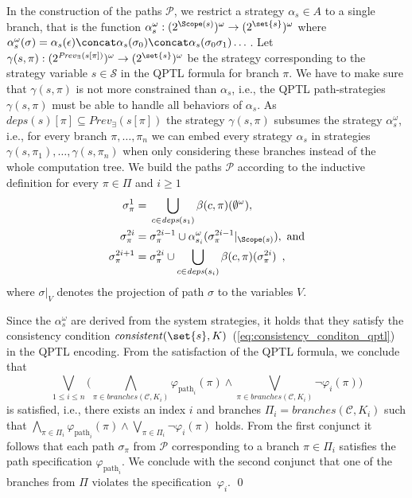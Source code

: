 \documentclass{LMCS}
\newcommand{\deps}{\mathit{deps}}
\newcommand{\branches}{\mathit{branches}}
\newcommand{\consistent}{\mathit{consistent}}
\newcommand{\Prev}{\mathit{Prev}}
\theoremstyle{plain}\newtheorem{theorem}[thm]{Theorem}
\theoremstyle{plain}\newtheorem{lemma}[thm]{Lemma}
\theoremstyle{plain}\newtheorem{proposition}[thm]{Proposition}
\theoremstyle{plain}\newtheorem{corollary}[thm]{Corollary}
\theoremstyle{definition}\newtheorem{definition}{Definition}[section]
\begin{document}
  In the construction of the paths $\mathcal{P}$, we restrict a strategy $\alpha_s \in A$ to a single branch, that is the function $\alpha_s^\omega : (2^{\Scope(s)})^\omega \rightarrow (2^\set{s})^\omega$ where $\alpha_s^\omega(\sigma) = \alpha_s(\epsilon) \concat \alpha_s(\sigma_0) \concat \alpha_s(\sigma_0 \sigma_1) \dots$.
  Let $\gamma(s,\pi) : (2^{\Prev_\exists(s[\pi])})^\omega \rightarrow (2^\set{s})^\omega$ be the strategy corresponding to the strategy variable $s \in \mathcal{S}$ in the QPTL formula for branch $\pi$.
  We have to make sure that $\gamma(s,\pi)$ is not more constrained than $\alpha_s$, i.e., the QPTL path-strategies $\gamma(s,\pi)$ must be able to handle all behaviors of $\alpha_s$.
  As $\deps(s)[\pi] \subseteq \Prev_\exists(s[\pi])$ the strategy $\gamma(s,\pi)$ subsumes the strategy $\alpha_s^\omega$, i.e., for every branch $\pi,\dots,\pi_n$ we can embed every strategy $\alpha_s$ in strategies $\gamma(s,\pi_1),\dots,\gamma(s,\pi_n)$ when only considering these branches instead of the whole computation tree.
  We build the paths $\mathcal{P}$ according to the inductive definition for every $\pi \in \Pi$ and $i \geq 1$
  \begin{align*}
    \sigma_\pi^1 = {}& \bigcup_{c \in \deps(s_1)} \beta(c,\pi)(\emptyset^\omega) , \\
    \sigma_\pi^{2i} = {}& \sigma_\pi^{2i-1} \cup \alpha_{s_i}^\omega(\sigma_\pi^{2i-1} |_{\Scope(s)}) , \text{ and}\\
    \sigma_\pi^{2i+1} = {}& \sigma_\pi^{2i} \cup \bigcup_{c \in \deps(s_i)} \beta(c,\pi)(\sigma_\pi^{2i}) \enspace,
  \end{align*}
  where $\sigma|_V$ denotes the projection of path $\sigma$ to the variables $V$.
  
  Since the $\alpha_s^\omega$ are derived from the system strategies, it holds that they satisfy the consistency condition $\consistent(\set{s},K)$~(\ref{eq:consistency_conditon_qptl}) in the QPTL encoding.
  From the satisfaction of the QPTL formula, we conclude that
  \begin{equation*}
    \bigvee_{1 \leq i \leq n} \big( \bigwedge_{\pi \in \branches(\mathcal{C},K_i)} \varphi_{\text{path}_i}(\pi) \land \bigvee_{\pi \in \branches(\mathcal{C},K_i)} \neg\varphi_i(\pi) \big)
  \end{equation*}
   is satisfied, i.e., there exists an index $i$ and branches $\Pi_i = \branches(\mathcal{C},K_i)$ such that $\bigwedge_{\pi \in \Pi_i} \varphi_{\text{path}_i}(\pi) \land \bigvee_{\pi \in \Pi_i} \neg\varphi_i(\pi)$ holds.
  From the first conjunct it follows that each path $\sigma_\pi$ from $\mathcal{P}$ corresponding to a branch $\pi \in \Pi_i$ satisfies the path specification $\varphi_{\text{path}_i}$.
  We conclude with the second conjunct that one of the branches from $\Pi$ violates the specification~$\varphi_i$.
\qed
\end{document}
